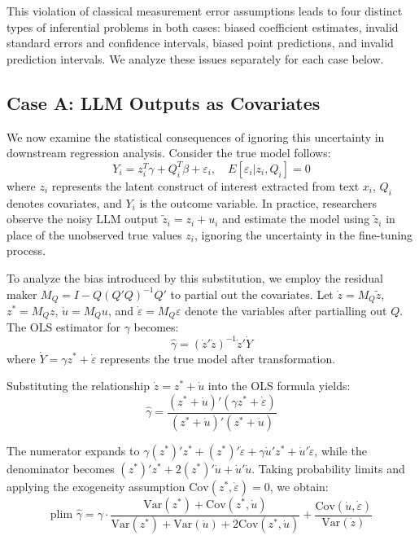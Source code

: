 \documentclass[11pt]{article}
\begin{document}
This violation of classical measurement error assumptions leads to four distinct types of inferential problems in both cases:
biased coefficient estimates, invalid standard errors and confidence intervals, biased point predictions, and invalid prediction intervals.
We analyze these issues separately for each case below.

\subsection{Case A: LLM Outputs as Covariates}

We now examine the statistical consequences of ignoring this uncertainty in downstream regression analysis.
Consider the true model follows:
\begin{equation}
Y_i = z_i^T\gamma + Q_i^T\beta + \varepsilon_i, \quad E[\varepsilon_i|z_i, Q_i] = 0
\end{equation}
where $z_i$ represents the latent construct of interest extracted from text $x_i$, $Q_i$ denotes covariates, and $Y_i$ is the outcome variable.
In practice, researchers observe the noisy LLM output $\tilde{z}_i = z_i + u_i$ and
estimate the model using $\tilde{z}_i$ in place of the unobserved true values $z_i$, ignoring the uncertainty in the fine-tuning process.

To analyze the bias introduced by this substitution, we employ the residual maker $M_Q = I - Q(Q'Q)^{-1}Q'$ to partial out the covariates. 
Let $\dot{z} = M_Q\tilde{z}$, $z^* = M_Q z$, $\dot{u} = M_Q u$, and $\dot{\varepsilon} = M_Q \varepsilon$ denote the variables after partialling out $Q$. The OLS estimator for $\gamma$ becomes:
\begin{equation}
\hat{\gamma} = (\dot{z}'\dot{z})^{-1}\dot{z}'\dot{Y}
\end{equation}
where $\dot{Y} = \gamma z^* + \dot{\varepsilon}$ represents the true model after transformation.

Substituting the relationship $\dot{z} = z^* + \dot{u}$ into the OLS formula yields:
\begin{equation}
\hat{\gamma} = \frac{(z^* + \dot{u})'(\gamma z^* + \dot{\varepsilon})}{(z^* + \dot{u})'(z^* + \dot{u})}
\end{equation}

The numerator expands to $\gamma (z^*)' z^* + (z^*)' \dot{\varepsilon} + \gamma \dot{u}' z^* + \dot{u}' \dot{\varepsilon}$, while the denominator becomes $(z^*)' z^* + 2(z^*)' \dot{u} + \dot{u}' \dot{u}$. Taking probability limits and applying the exogeneity assumption $\text{Cov}(z^*, \dot{\varepsilon}) = 0$, we obtain:
\begin{equation}
\text{plim } \hat{\gamma} = \gamma \cdot \frac{\text{Var}(z^*) + \text{Cov}(z^*, \dot{u})}{\text{Var}(z^*) + \text{Var}(\dot{u}) + 2\text{Cov}(z^*, \dot{u})} + \frac{\text{Cov}(\dot{u}, \dot{\varepsilon})}{\text{Var}(\dot{z})} \tag{A1}
\end{equation}
\end{document}
